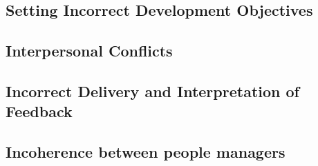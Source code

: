 \subsection{Setting Incorrect Development Objectives}
\label{subsec:devobjectives}
\newline

\subsection{Interpersonal Conflicts}
\label{subsec:conflicts}
\newline

\subsection{Incorrect Delivery and Interpretation of Feedback}
\label{subsec:incorrectfeedback}
\newline

\subsection{Incoherence between people managers}
\label{subsec:incoherence}
\newline

